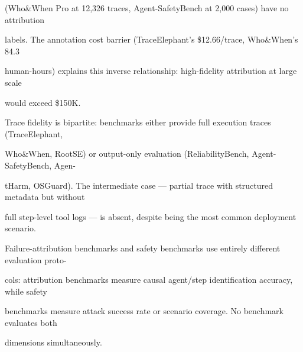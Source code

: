 \begin{flushleft}
\noindent  (Who\&When Pro at 12,326 traces, Agent-SafetyBench at 2,000 cases) have no attribution\par
\noindent  labels. The annotation cost barrier (TraceElephant’s \$12.66/trace, Who\&When’s 84.3\par
\noindent  human-hours) explains this inverse relationship: high-fidelity attribution at large scale\par
\noindent  would exceed \$150K.\par
\noindent  Trace fidelity is bipartite: benchmarks either provide full execution traces (TraceElephant,\par
\noindent Who\&When, RootSE) or output-only evaluation (ReliabilityBench, Agent-SafetyBench, Agen-\par
\noindent tHarm, OSGuard). The intermediate case — partial trace with structured metadata but without\par
\noindent full step-level tool logs — is absent, despite being the most common deployment scenario.\par
\noindent Failure-attribution benchmarks and safety benchmarks use entirely different evaluation proto-\par
\noindent cols: attribution benchmarks measure causal agent/step identification accuracy, while safety\par
\noindent benchmarks measure attack success rate or scenario coverage. No benchmark evaluates both\par
\noindent dimensions simultaneously.\par
\end{flushleft}
